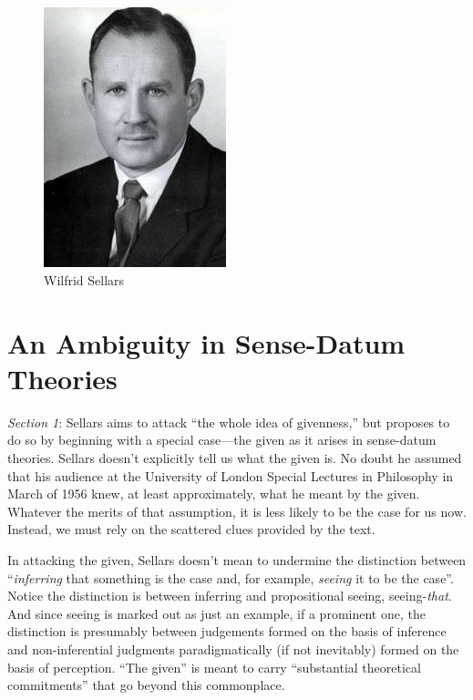 \documentclass[11pt]{article}
\title{\mytitle\\
\mysubtitle}
\author{\myauthor}
\date{} %
\begin{document}
\maketitle

\setlength{\parindent}{1em}


\begin{figure}[htbp]
	\centering
		\includegraphics[scale=0.5]{../graphics/sellars.jpeg}
	\caption{Wilfrid Sellars}
	\label{fig:sellars}
\end{figure}

\section{An Ambiguity in Sense-Datum Theories} %
\label{sec:an_ambiguity_in_sense_datum_theories}

\emph{Section 1}: Sellars aims to attack ``the whole idea of givenness,'' but proposes to do so by beginning with a special case---the given as it arises in sense-datum theories. Sellars doesn't explicitly tell us what the given is. No doubt he assumed that his audience at the University of London Special Lectures in Philosophy in March of 1956 knew, at least approximately, what he meant by the given. Whatever the merits of that assumption, it is less likely to be the case for us now. Instead, we must rely on the scattered clues provided by the text.

In attacking the given, Sellars doesn't mean to undermine the distinction between ``\emph{inferring} that something is the case and, for example, \emph{seeing} it to be the case''. Notice the distinction is between inferring and propositional seeing, seeing-\emph{that}. And since seeing is marked out as just an example, if a prominent one, the distinction is presumably between judgements formed on the basis of inference and non-inferential judgments paradigmatically (if not inevitably) formed on the basis of perception. ``The given'' is meant to carry ``substantial theoretical commitments'' that go beyond this commonplace.
\end{document}
